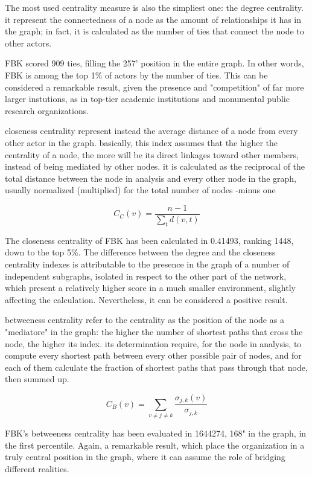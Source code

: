 The most used centrality measure is also the simpliest one: the degree centrality. it represent the connectedness of a node as the amount of relationships it has in the graph; in fact, it is calculated as the number of ties that connect the node to other actors.  

FBK scored 909 ties, filling the 257' position in the entire graph. In other words, FBK is among the top 1\% of actors by the number of ties. This can be considered a remarkable result, given the presence and "competition" of far more larger instutions, as in top-tier academic institutions and monumental public research organizations. 

closeness centrality represent instead the average distance of a node from every other actor in the graph. basically, this index assumes that the higher the centrality of a node, the more will be its direct linkages toward other members, instead of being mediated by other nodes. it is calculated as the reciprocal of the total distance between the node in analysis and every other node in the graph, usually normalized (multiplied) for the total number of nodes -minus one 


\[
	C_C (v) =
		\frac 
			{n-1}
			{
				\sum_t d(v, t)
			} 
\]


The closeness centrality of FBK has been  calculated in 0.41493, ranking 1448, down to the top 5\%. The difference between the degree and the closeness centrality indexes is attributable to the presence in the graph of a number of independent subgraphs, isolated in respect to the other part of the network, which present a relatively higher score in a much smaller environment, slightly affecting the calculation. Nevertheless, it can be considered a positive result.  

betweeness centrality refer to the centrality as the position of the node as a "mediatore" in the graph: the higher the number of shortest paths that cross the node, the higher its index. its determination require, for the node in analysis, to compute every shortest path between every other possible pair of nodes, and for each of them calculate the fraction of shortest paths that pass through that node, then summed up. 

\[
	C_B (v) =
		\sum_{v \neq j \neq k}
			\frac {\sigma_{j,k} (v)}{\sigma_{j,k}}
\]

FBK's betweeness centrality has been evaluated in 1644274, 168" in the graph, in the first percentile. Again, a remarkable result, which place the organization in a truly central position in the graph, where it can assume the role of bridging different realities. 

